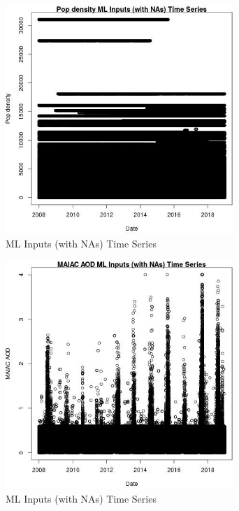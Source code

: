 \begin{figure} 
\centering  
\includegraphics[width=0.77\textwidth]{Code_Outputs/Report_ML_input_PM25_Step4_part_f_de_duplicated_aveswNAs_Pop_densityvDate.jpg} 
\caption{\label{fig:Report_ML_input_PM25_Step4_part_f_de_duplicated_aveswNAsPop_densityvDate}ML Inputs (with NAs) Time Series} 
\end{figure} 
 

\begin{figure} 
\centering  
\includegraphics[width=0.77\textwidth]{Code_Outputs/Report_ML_input_PM25_Step4_part_f_de_duplicated_aveswNAs_MAIAC_AODvDate.jpg} 
\caption{\label{fig:Report_ML_input_PM25_Step4_part_f_de_duplicated_aveswNAsMAIAC_AODvDate}ML Inputs (with NAs) Time Series} 
\end{figure} 
 

